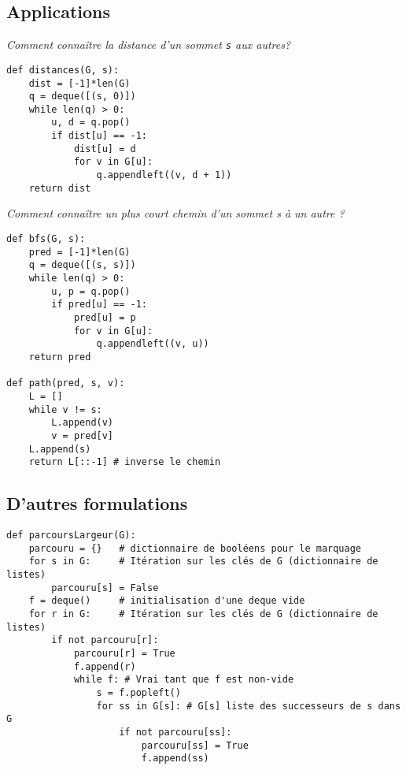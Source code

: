 \subsection{Applications}
\begin{exemple}
\textit{Comment connaître la distance d'un sommet \texttt{s} aux autres?}
\ifprof
\begin{lstlisting}
def distances(G, s):
    dist = [-1]*len(G)
    q = deque([(s, 0)])
    while len(q) > 0:
        u, d = q.pop()
        if dist[u] == -1:
            dist[u] = d
            for v in G[u]:
                q.appendleft((v, d + 1))
    return dist
\end{lstlisting}
\else
\vspace{5cm}
\fi
\end{exemple}

\begin{exemple}
\textit{Comment connaître un plus court chemin d’un sommet s à un autre ? }
\ifprof
\begin{lstlisting}
def bfs(G, s):
    pred = [-1]*len(G)
    q = deque([(s, s)])
    while len(q) > 0:
        u, p = q.pop()
        if pred[u] == -1:
            pred[u] = p
            for v in G[u]:
                q.appendleft((v, u))
    return pred
    
def path(pred, s, v):
    L = []
    while v != s:
        L.append(v)
        v = pred[v]
    L.append(s)
    return L[::-1] # inverse le chemin
\end{lstlisting}
\else
\vspace{10cm}
\fi
\end{exemple}

\subsection{D'autres formulations}

\begin{lstlisting}
def parcoursLargeur(G):
    parcouru = {}   # dictionnaire de booléens pour le marquage
    for s in G:     # Itération sur les clés de G (dictionnaire de listes)
        parcouru[s] = False
    f = deque()     # initialisation d'une deque vide
    for r in G:     # Itération sur les clés de G (dictionnaire de listes)
        if not parcouru[r]:
            parcouru[r] = True
            f.append(r)
            while f: # Vrai tant que f est non-vide
                s = f.popleft()
                for ss in G[s]: # G[s] liste des successeurs de s dans G
                    if not parcouru[ss]:
                        parcouru[ss] = True
                        f.append(ss)
\end{lstlisting}


